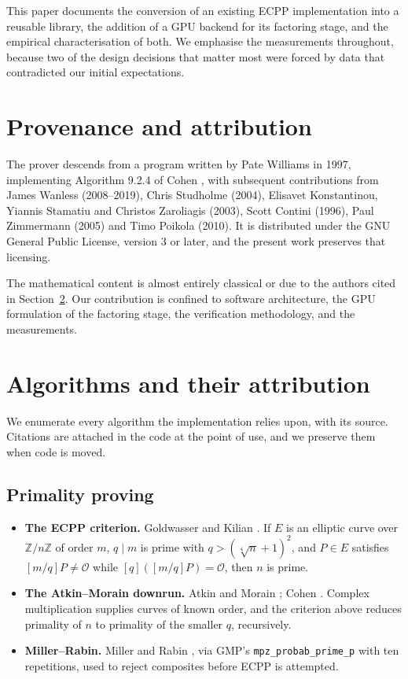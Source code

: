 \documentclass[11pt,a4paper]{article}
\newcommand{\code}[1]{\texttt{#1}}
\begin{document}
This paper documents the conversion of an existing ECPP implementation
into a reusable library, the addition of a GPU backend for its factoring
stage, and the empirical characterisation of both. We emphasise the
measurements throughout, because two of the design decisions that matter
most were forced by data that contradicted our initial expectations.

\section{Provenance and attribution}

The prover descends from a program written by Pate Williams in 1997,
implementing Algorithm 9.2.4 of Cohen \cite{cohen1993}, with subsequent
contributions from James Wanless (2008--2019), Chris Studholme (2004),
Elisavet Konstantinou, Yiannis Stamatiu and Christos Zaroliagis (2003),
Scott Contini (1996), Paul Zimmermann (2005) and Timo Poikola (2010). It
is distributed under the GNU General Public License, version 3 or later,
and the present work preserves that licensing.

The mathematical content is almost entirely classical or due to the
authors cited in Section~\ref{sec:algorithms}. Our contribution is
confined to software architecture, the GPU formulation of the factoring
stage, the verification methodology, and the measurements.

\section{Algorithms and their attribution}
\label{sec:algorithms}

We enumerate every algorithm the implementation relies upon, with its
source. Citations are attached in the code at the point of use, and we
preserve them when code is moved.

\subsection{Primality proving}

\begin{itemize}
  \item \textbf{The ECPP criterion.} Goldwasser and Kilian
    \cite{goldwasser1986}. If $E$ is an elliptic curve over
    $\mathbb{Z}/n\mathbb{Z}$ of order $m$, $q \mid m$ is prime with
    $q > (\sqrt[4]{n}+1)^2$, and $P \in E$ satisfies $[m/q]P \neq
    \mathcal{O}$ while $[q]([m/q]P) = \mathcal{O}$, then $n$ is prime.
  \item \textbf{The Atkin--Morain downrun.} Atkin and Morain
    \cite{atkin1993}; Cohen \cite[Algorithm 9.2.4, p.~474]{cohen1993}.
    Complex multiplication supplies curves of known order, and the
    criterion above reduces primality of $n$ to primality of the smaller
    $q$, recursively.
  \item \textbf{Miller--Rabin.} Miller \cite{miller1976} and Rabin
    \cite{rabin1980}, via GMP's \code{mpz\_probab\_prime\_p} with ten
    repetitions, used to reject composites before ECPP is attempted.
\end{itemize}
\end{document}
